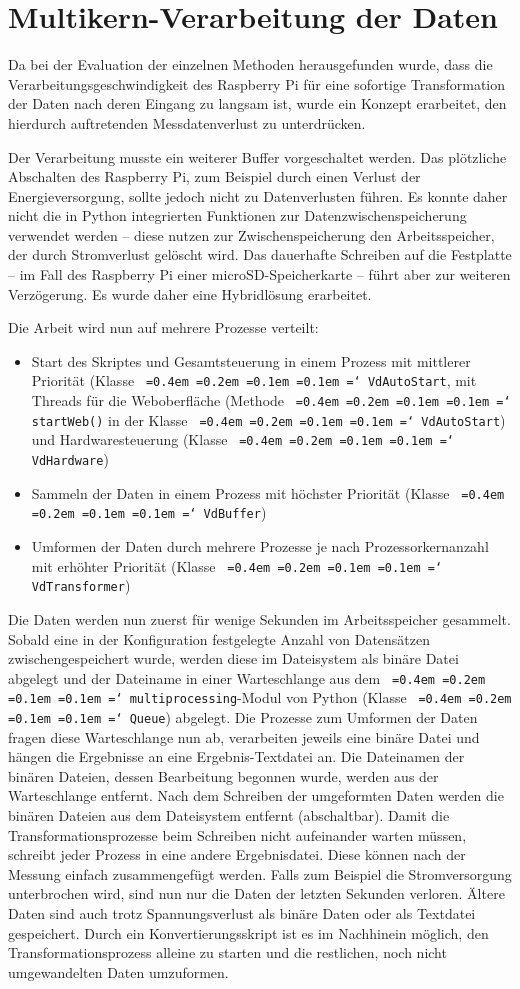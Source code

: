 \documentclass[a4paper,12pt,bibliography=totoc, listof=totoc,titlepage,pointlessnumbers]{scrreprt}
\newcommand*\justify{%
  \fontdimen2\font=0.4em%
  \fontdimen3\font=0.2em%
  \fontdimen4\font=0.1em%
  \fontdimen7\font=0.1em%
  \hyphenchar\font=`\-%
}
\newcommand{\code}[1]{\texttt{\justify{#1}}}
\begin{document}
\section{Multikern-Verarbeitung der Daten}
\label{s:multikern}
Da bei der Evaluation der einzelnen Methoden herausgefunden wurde, dass die Verarbeitungsgeschwindigkeit des Rasp\-berry Pi für eine sofortige Transformation der Daten nach deren Eingang zu langsam ist, wurde ein Konzept erarbeitet, den hierdurch auftretenden Messdatenverlust zu unterdrücken.

Der Verarbeitung musste ein weiterer Buffer vorgeschaltet werden. Das plötzliche Abschalten des Rasp\-berry Pi, zum Beispiel durch einen Verlust der Energieversorgung, sollte jedoch nicht zu Datenverlusten führen. Es konnte daher nicht die in Python integrierten Funktionen zur Datenzwischenspeicherung verwendet werden -- diese nutzen zur Zwischenspeicherung den Arbeitsspeicher, der durch Stromverlust gelöscht wird. Das dauerhafte Schreiben auf die Festplatte -- im Fall des Rasp\-berry Pi einer microSD-Speicherkarte -- führt aber zur weiteren Verzögerung. Es wurde daher eine Hybridlösung erarbeitet.

Die Arbeit wird nun auf mehrere Prozesse verteilt:
\begin{itemize}
 \item Start des Skriptes und Gesamtsteuerung in einem Prozess mit mittlerer Priorität (Klasse \code{VdAutoStart}, mit Threads für die Weboberfläche (Methode \code{startWeb()} in der Klasse \code{VdAutoStart}) und Hardwaresteuerung (Klasse \code{VdHardware})
 \item Sammeln der Daten in einem Prozess mit höchster Priorität (Klasse \code{VdBuffer})
 \item Umformen der Daten durch mehrere Prozesse je nach Prozessorkernanzahl mit erhöhter Priorität (Klasse \code{VdTransformer})
\end{itemize}

Die Daten werden nun zuerst für wenige Sekunden im Arbeitsspeicher gesammelt. Sobald eine in der Konfiguration festgelegte Anzahl von Datensätzen zwischengespeichert wurde, werden diese im Dateisystem als binäre Datei abgelegt und der Dateiname in einer Warteschlange aus dem \code{multiprocessing}-Modul von Python (Klasse \code{Queue}) abgelegt. Die Prozesse zum Umformen der Daten fragen diese Warteschlange nun ab, verarbeiten jeweils eine binäre Datei und hängen die Ergebnisse an eine Ergebnis-Textdatei an. Die Dateinamen der binären Dateien, dessen Bearbeitung begonnen wurde, werden aus der Warteschlange entfernt. Nach dem Schreiben der umgeformten Daten werden die binären Dateien aus dem Dateisystem entfernt (abschaltbar). Damit die Transformationsprozesse beim Schreiben nicht aufeinander warten müssen, schreibt jeder Prozess in eine andere Ergebnisdatei. Diese können nach der Messung einfach zusammengefügt werden. Falls zum Beispiel die Stromversorgung unterbrochen wird, sind nun nur die Daten der letzten Sekunden verloren. Ältere Daten sind auch trotz Spannungsverlust als binäre Daten oder als Textdatei gespeichert. Durch ein Konvertierungsskript ist es im Nachhinein möglich, den Transformationsprozess alleine zu starten und die restlichen, noch nicht umgewandelten Daten umzuformen.
\end{document}
